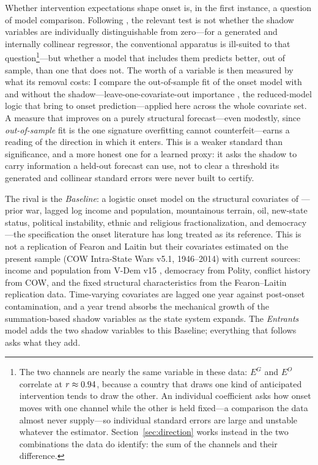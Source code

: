 Whether intervention expectations shape onset is, in the first instance, a
question of model comparison.  Following \citet{clarke2007}, the relevant test
is not whether the shadow variables are individually distinguishable from
zero---for a generated and internally collinear regressor, the conventional
apparatus is ill-suited to that question\footnote{The two channels are nearly
the same variable in these data: $E^G$ and $E^O$ correlate at $r \approx
0.94$, because a country that draws one kind of anticipated intervention tends
to draw the other.  An individual coefficient asks how onset moves with one
channel while the other is held fixed---a comparison the data almost never
supply---so individual standard errors are large and unstable whatever the
estimator.  Section~\ref{sec:direction} works instead in the two combinations
the data do identify: the sum of the channels and their difference.}---but
whether a model that includes them predicts better, out of sample, than one
that does not.  The worth of a
variable is then measured by what its removal costs: I compare the
out-of-sample fit of the onset model with and without the
shadow---leave-one-covariate-out importance \citep{lei2018}, the reduced-model
logic that \citet{mcalexandermentch2020} bring to onset
prediction---applied here across the whole covariate set.  A measure that improves on a
purely structural forecast---even modestly, since \emph{out-of-sample} fit is
the one signature overfitting cannot counterfeit---earns a reading of the
direction in which it enters.  This is a weaker standard than significance, and a more honest one
for a learned proxy: it asks the shadow to carry information a held-out
forecast can use, not to clear a threshold its generated and collinear
standard errors were never built to certify.

The rival is the \textit{Baseline}: a logistic onset model on the structural
covariates of \citet{fearon2003}---prior war, lagged log income and population,
mountainous terrain, oil, new-state status, political instability, ethnic and
religious fractionalization, and democracy---the specification the onset
literature has long treated as its reference.  This is not a replication of
Fearon and Laitin but their covariates estimated on the present sample (COW
Intra-State Wars v5.1, 1946--2014) with current sources: income and population
from V-Dem v15 \citep{vdem2025}, democracy from Polity, conflict history from
COW, and the fixed structural characteristics from the Fearon--Laitin
replication data.  Time-varying covariates are lagged one year against
post-onset contamination, and a year trend absorbs the mechanical growth of the
summation-based shadow variables as the state system expands.  The
\textit{Entrants} model adds the two shadow variables to this Baseline;
everything that follows asks what they add.

